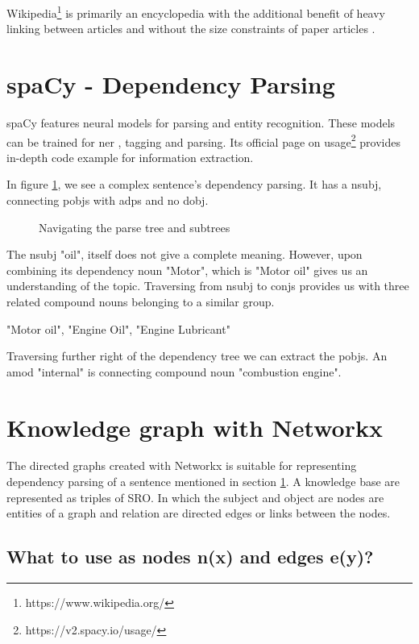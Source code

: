 Wikipedia\footnote{https://www.wikipedia.org/} is primarily an encyclopedia with the additional benefit of heavy linking between articles and without the size constraints of paper articles \parencite{TorstenZesch}. 

\section{spaCy - Dependency Parsing} \label{dependencyparsing}

spaCy \parencite{spacy2} features neural models for parsing and entity recognition. These models can be trained for \acf{ner} , tagging and parsing. Its official page on usage\footnote {https://v2.spacy.io/usage/} provides in-depth code example for information extraction.

In figure \ref{fig:dp}, we see a complex sentence's dependency parsing. It has a \acf{nsubj}, connecting \acfp{pobj} with \acfp{adp} and no \acf{dobj}.

\begin{figure}[htp!]
    \centering    
    
    \caption{Navigating the parse tree and subtrees}
    \label{fig:dp}
\end{figure}

The \acs{nsubj} "oil", itself does not give a complete meaning. However, upon combining its dependency noun "Motor", which is "Motor oil"  gives us an understanding of the topic. Traversing from \acs{nsubj} to  \acfp{conj} provides us with three related compound nouns belonging to a similar group.

"Motor oil", "Engine Oil", "Engine Lubricant"

Traversing further right of the dependency tree we can extract the \acsp{pobj}.  An \acf{amod} "internal" is connecting compound noun "combustion engine".

\section{Knowledge graph with Networkx}

The directed graphs created with Networkx \parencite{hagberg2008exploring} is suitable for representing dependency parsing of a sentence mentioned in section \ref{dependencyparsing}. A knowledge base are represented as triples of \acf{SRO}. In which the subject and object are nodes are entities of a graph and relation are directed edges or links between the nodes.

\subsection{What to use as nodes n(x) and edges e(y)?}

